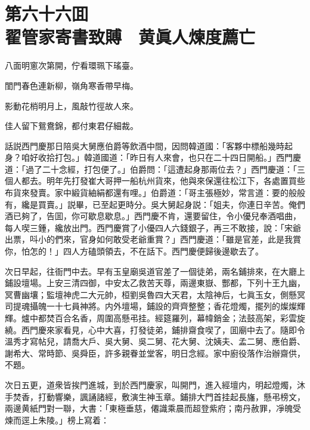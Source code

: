 
\chapter*{第六十六囬　\\翟管家寄書致賻　黄眞人煉度薦亡}


\begin{myquote}
八面明窻次第開，佇看環珮下瑤臺。

閨門春色連新柳，嶺角寒香帶早梅。

影動花梢明月上，風敲竹徑故人來。

佳人留下鴛鴦錦，都付東君仔細裁。
\end{myquote}

話説西門慶那日陪吳大舅應伯爵等飲酒中間，因問韓道國：「客夥中標船幾時起身？咱好收拾打包。」韓道國道：「昨日有人來會，也只在二十四日開船。」西門慶道：「過了二十念經，打包便了。」伯爵問：「這遭起身那兩位去？」西門慶道：「三個人都去。明年先打發崔大哥押一船杭州貨來，他與來保還往松江下，各處置買些布貨來發賣。家中緞貨紬絹都還有哩。」伯爵道：「哥主張極妙，常言道：要的般般有，纔是買賣。」説畢，已至起更時分。吳大舅起身説：「姐夫，你連日辛苦。俺們酒已夠了，告囬，你可歇息歇息。」西門慶不肯，還要留住，令小優兒奉酒唱曲，每人喫三鍾，纔放出門。西門慶賞了小優四人六錢銀子，再三不敢接，說：「宋爺出票，呌小的們來，官身如何敢受老爺重賞？」西門慶道：「雖是官差，此是我賞你，怕怎的！」四人方磕頭領去，不在話下。西門慶便歸後邊歇去了。

次日早起，往衙門中去。早有玉皇廟吳道官差了一個徒弟，兩名鋪排來，在大廳上鋪設壇場。上安三清四御，中安太乙救苦天尊，兩邊東嶽、酆都，下列十王九幽，冥曹幽壤；監壇神虎二大元帥，桓劉吳魯四大天君，太陰神后，七眞玉女，側懸冥司提魂攝魄一十七員神將。内外壇場，鋪設的齊齊整整；香花燈燭，擺列的燦燦輝輝。爐中都焚百合名香，周圍高懸弔挂。經筵羅列，幕幃銷金；法鼓高架，彩雲旋繞。西門慶來家看見，心中大喜，打發徒弟，鋪排齋食喫了，囬廟中去了。隨即令溫秀才寫帖兒，請喬大戶、吳大舅、吳二舅、花大舅、沈姨夫、孟二舅、應伯爵、謝希大、常時節、吳舜臣，許多親眷並堂客，明日念經。家中廚役落作治辦齋供，不題。

次日五更，道衆皆挨門進城，到於西門慶家，叫開門，進入經壇内，明起燈燭，沐手焚香，打動響樂，諷誦諸經，敷演生神玉章。鋪排大門首挂起長旛，懸弔榜文，兩邊黄紙門對一聯，大書：「東極垂慈，僊識乘晨而超登紫府；南丹赦罪，凈魄受煉而逕上朱陵。」榜上寫着：

